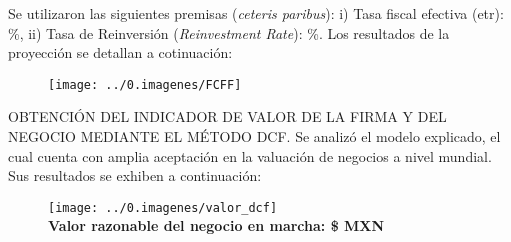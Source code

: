 Se utilizaron las siguientes premisas (\textit{ceteris paribus}): i) Tasa fiscal efectiva (\gls{etr}): \tasaFiscal\%, ii) Tasa de Reinversi\'on (\textit{Reinvestment Rate}): \reinvestmentRate\%. Los resultados de la proyecci\'on se detallan a cotinuaci\'on:

\begin{figure}[H]
\centering
\texttt{[image: ../0.imagenes/FCFF]}
\end{figure}



\textcolor{principal}{OBTENCI\'ON DEL INDICADOR DE VALOR DE LA FIRMA Y DEL NEGOCIO MEDIANTE EL M\'ETODO DCF.} Se analiz\'o el modelo explicado, el cual cuenta con amplia aceptaci\'on en la valuaci\'on de negocios a nivel mundial.  Sus resultados se exhiben a continuaci\'on:

\begin{figure}[H]
\centering
\texttt{[image: ../0.imagenes/valor\_dcf]}\\
\textcolor{principal}{\textbf{\textbullet Valor razonable del negocio en marcha: \$\valorDCF{} MXN}}
\end{figure}

